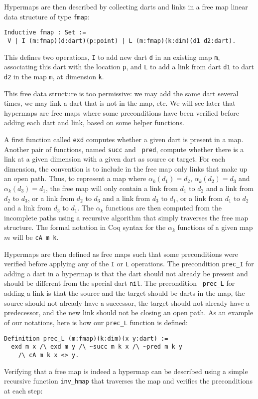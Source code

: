\documentclass{llncs}
\begin{document}
Hypermaps are then described by collecting darts and links in a free map
linear data structure of type {\tt fmap}: 

\begin{verbatim}
Inductive fmap : Set :=
 V | I (m:fmap)(d:dart)(p:point) | L (m:fmap)(k:dim)(d1 d2:dart).
\end{verbatim}
This defines two operations, {\tt I} to add new dart {\tt d} in an
existing map {\tt m}, associating this dart with the location {\tt p},
and {\tt L} to add a link from dart {\tt d1} to dart {\tt d2} in
the map {\tt m}, at dimension {\tt k}.

This free data structure is too permissive: we
may add the same dart several times, we may link a dart that is not in
the map, etc.  We will see
later that hypermaps are free maps where some preconditions have been
verified before adding each dart and link, based on some helper functions.

A first function called {\tt exd} computes whether a given dart is
present in a map. Another pair of functions, named {\tt succ} and {\tt
  pred}, compute whether there is a link at a given dimension
with a given dart as source or target.  For each dimension, the
convention is to include in the free map only links that make up an
open path.  Thus, to represent a map where 
\(\alpha_k(d_1)=d_2\), \(\alpha_k(d_2)=d_3\) and \(\alpha_k(d_3)=d_1\), the
free map will only
contain a link from \(d_1\) to \(d_2\) and a link from \(d_2\) to
\(d_3\), or a link from \(d_2\) to \(d_3\) and a link from \(d_3\) to
\(d_1\), or a link from \(d_1\) to \(d_2\) and a link from \(d_3\) to
\(d_1\).  The \(\alpha_k\) functions are then
computed from the incomplete paths using a recursive algorithm that
simply traverses the free map structure.
  The formal notation in Coq syntax for the \(\alpha_k\)
functions of a given map \(m\) will be {\tt cA m k}. 

Hypermaps are then defined as free maps such that some preconditions
were verified before applying any of the {\tt I} or {\tt L}
operations.  The precondition {\tt prec\_I} for adding a dart in a
hypermap is that the dart should not already be present and should be
different from the special dart {\tt nil}. The precondition {\tt
  prec\_L} for adding a link is that the source and the target should
be darts in the map, the source should not already have a successor,
the target should not already have a predecessor, and the new link
should not be closing an open path.  As an example of our notations,
here is how our {\tt prec\_L} function is defined:
\begin{verbatim}
Definition prec_L (m:fmap)(k:dim)(x y:dart) :=
  exd m x /\ exd m y /\ ~succ m k x /\ ~pred m k y
    /\ cA m k x <> y.
\end{verbatim}
Verifying that a free map is indeed a hypermap can be described using
a simple recursive function {\tt inv\_hmap} that traverses the map and
verifies the preconditions at each step:
\end{document}
